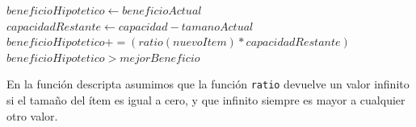 \documentclass[10pt, a4paper]{article}
\begin{document}
\begin{algorithm}
\begin{algorithmic}[1]

	\State $beneficioHipotetico \gets beneficioActual$
	\State $capacidadRestante \gets capacidad - tamanoActual$
	\State $beneficioHipotetico += ( ratio(nuevoItem) * capacidadRestante )$
	\State \Return $beneficioHipotetico > mejorBeneficio$
\EndFunction

\end{algorithmic}
\end{algorithm}

En la función descripta asumimos que la función \texttt{ratio} devuelve un valor infinito si el tamaño del ítem es igual a cero, y que infinito siempre es mayor a cualquier otro valor.\par
\end{document}
